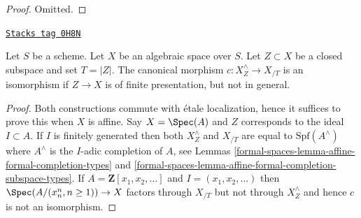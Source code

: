 \begin{proof}
Omitted.
\end{proof}

\begin{lemma}
\label{formal-spaces-lemma-when-isomorphism}
\href{https://stacks.math.columbia.edu/tag/0H8N}{\texttt{Stacks tag 0H8N}}

Let $S$ be a scheme. Let $X$ be an algebraic space over $S$.
Let $Z \subset X$ be a closed subspace and set $T = |Z|$. The canonical
morphism $c : X^\wedge_Z \to X_{/T}$ is an isomorphism if $Z \to X$
is of finite presentation, but not in general.
\end{lemma}

\begin{proof}
Both constructions commute with \'etale localization, hence it suffices
to prove this when $X$ is affine. Say $X = \Spec(A)$ and $Z$ corresponds
to the ideal $I \subset A$. If $I$ is finitely generated then both
$X^\wedge_Z$ and $X_{/T}$ are equal to $\text{Spf}(A^\wedge)$ where $A^\wedge$
is the $I$-adic completion of $A$, see
Lemmas \ref{formal-spaces-lemma-affine-formal-completion-types} and
\ref{formal-spaces-lemma-affine-formal-completion-subspace-types}.
If $A = \mathbf{Z}[x_1, x_2, \ldots]$ and $I = (x_1, x_2, \ldots)$
then $\Spec(A/(x_n^n, n \geq 1)) \to X$ factors through $X_{/T}$
but not through $X^\wedge_Z$ and hence $c$ is not an isomorphism.
\end{proof}



